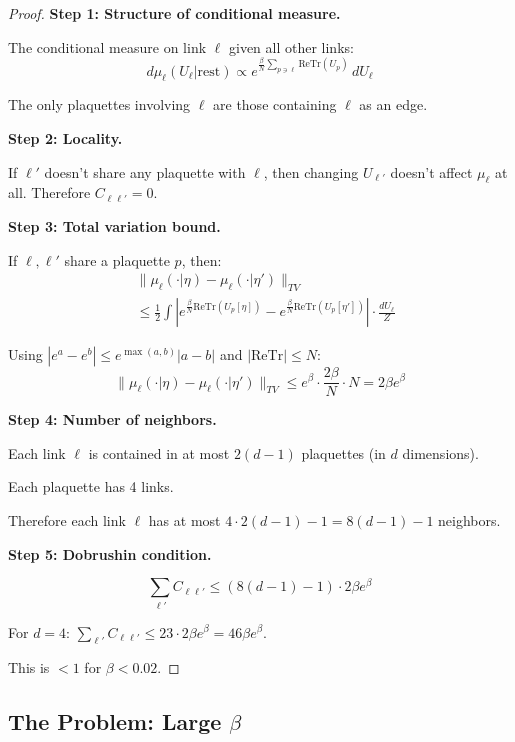 \begin{proof}
\textbf{Step 1: Structure of conditional measure.}

The conditional measure on link $\ell$ given all other links:
\[
d\mu_\ell(U_\ell | \text{rest}) \propto e^{\frac{\beta}{N} \sum_{p \ni \ell} \mathrm{Re}\mathrm{Tr}(U_p)} \, dU_\ell
\]

The only plaquettes involving $\ell$ are those containing $\ell$ as an edge.

\textbf{Step 2: Locality.}

If $\ell'$ doesn't share any plaquette with $\ell$, then changing $U_{\ell'}$ 
doesn't affect $\mu_\ell$ at all. Therefore $C_{\ell\ell'} = 0$.

\textbf{Step 3: Total variation bound.}

If $\ell, \ell'$ share a plaquette $p$, then:
\begin{align}
&\|\mu_\ell(\cdot | \eta) - \mu_\ell(\cdot | \eta')\|_{TV} \\
&\leq \frac{1}{2} \int |e^{\frac{\beta}{N}\mathrm{Re}\mathrm{Tr}(U_p[\eta])} - e^{\frac{\beta}{N}\mathrm{Re}\mathrm{Tr}(U_p[\eta'])}| \cdot \frac{dU_\ell}{Z}
\end{align}

Using $|e^a - e^b| \leq e^{\max(a,b)} |a-b|$ and $|\mathrm{Re}\mathrm{Tr}| \leq N$:
\[
\|\mu_\ell(\cdot | \eta) - \mu_\ell(\cdot | \eta')\|_{TV} \leq e^{\beta} \cdot \frac{2\beta}{N} \cdot N = 2\beta e^\beta
\]

\textbf{Step 4: Number of neighbors.}

Each link $\ell$ is contained in at most $2(d-1)$ plaquettes (in $d$ dimensions).

Each plaquette has 4 links.

Therefore each link $\ell$ has at most $4 \cdot 2(d-1) - 1 = 8(d-1) - 1$ neighbors.

\textbf{Step 5: Dobrushin condition.}

\[
\sum_{\ell'} C_{\ell\ell'} \leq (8(d-1) - 1) \cdot 2\beta e^\beta
\]

For $d = 4$: $\sum_{\ell'} C_{\ell\ell'} \leq 23 \cdot 2\beta e^\beta = 46\beta e^\beta$.

This is $< 1$ for $\beta < 0.02$.
\end{proof}

\subsection{The Problem: Large \texorpdfstring{$\beta$}{beta}}

